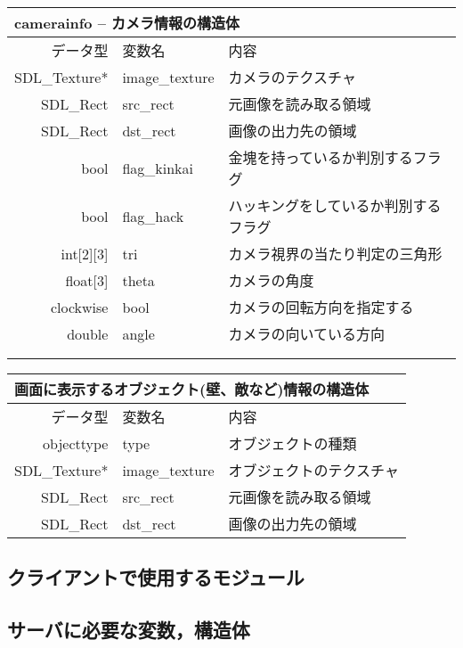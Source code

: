 \documentclass{jarticle}
\begin{document}
\begin{table}[H]
\begin{tabular}{|r|l|l|}
\hline
\multicolumn{3}{|l|}{camerainfo -- カメラ情報の構造体}       \\ \hline
データ型      & 変数名    & 内容        \\ \hline
SDL\_Texture* & image\_texture     & カメラのテクスチャ \\
SDL\_Rect & src\_rect & 元画像を読み取る領域 \\
SDL\_Rect & dst\_rect & 画像の出力先の領域 \\
bool & flag\_kinkai& 金塊を持っているか判別するフラグ\\
bool & flag\_hack & ハッキングをしているか判別するフラグ\\
int[2][3] & tri & カメラ視界の当たり判定の三角形\\
float[3] &  theta & カメラの角度 \\
clockwise & bool & カメラの回転方向を指定する\\
double & angle & カメラの向いている方向\\
& & \\
& & \\

\end{tabular}
\end{table}

\begin{table}[H]
\begin{tabular}{|r|l|l|}
\hline
\multicolumn{3}{|l|}{画面に表示するオブジェクト(壁、敵など)情報の構造体}       \\ \hline
データ型      & 変数名    & 内容        \\ \hline
objecttype    & type & オブジェクトの種類  \\
SDL\_Texture* & image\_texture     & オブジェクトのテクスチャ \\
SDL\_Rect & src\_rect & 元画像を読み取る領域 \\
SDL\_Rect & dst\_rect & 画像の出力先の領域 \\ \hline
\end{tabular}
\end{table}

\subsection{クライアントで使用するモジュール}

\subsection{サーバに必要な変数，構造体}
\end{document}
